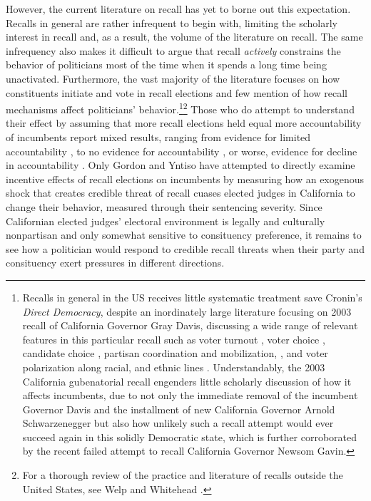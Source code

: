 \documentclass[hyphens, crop=false]{standalone}
\begin{document}
	However, the current literature on recall has yet to borne out this expectation.
	Recalls in general are rather infrequent to begin with,
	limiting the scholarly interest in recall and, as a result, the volume of the literature on recall.
	The same infrequency also makes it difficult to argue 
	that recall
	\textit
	{
		actively
	}
	constrains 
	the
	behavior of politicians 
	most of the time when it spends a long time being unactivated.
	Furthermore, the vast majority of the literature focuses on how 
	constituents initiate and vote in recall elections and 
	few mention of how recall mechanisms affect politicians' behavior.\footnote
	{
		Recalls in general in the US receives little systematic treatment save Cronin's
		\autocite{croninDirectDemocracyPolitics1989}
		\textit{Direct Democracy}, despite an inordinately large literature focusing on 2003 recall of California Governor Gray Davis, 
		discussing a wide range of relevant features in this particular recall such as 
		voter turnout
		\autocite{arbourVoterTurnoutCalifornia2005},
		voter choice 
		\autocite{alvarezRationalityRationalisticChoice2009,shawStrategicVotingCalifornia2005},
		candidate choice
		\autocite{mcgheeRoleCandidateChoice2009},
		partisan coordination and mobilization,
		\autocite{masketCaliforniaRecallSprint2016},
		and
		voter polarization along
		racial, and ethnic
		lines
		\autocite{seguraRaceRecallRacial2008}.
		Understandably, the 2003 California gubenatorial recall engenders little scholarly
		discussion of how it affects incumbents, 
		due to not only the immediate removal of the incumbent Governor Davis and 
		the
		installment of new California Governor Arnold Schwarzenegger
		but also 
		how unlikely such a recall attempt
		would ever succeed again in this solidly Democratic state,
		which is further corroborated by the recent failed attempt to recall California Governor Newsom Gavin.
	}\footnote
	{
		For a thorough review of the practice and literature of recalls outside the United States,
		see Welp and Whitehead \autocite*{welpPoliticsRecallElections2020}.
	}
	Those who do attempt to understand their effect
	by assuming that more recall elections held equal more accountability
	of incumbents report mixed results, 
	ranging from evidence for limited accountability
	\autocite{okamotoRecallJapanMeasure2020},
	to
	no evidence for accountability
	\autocite{welpRecallReferendumsPeruvian2016},
	or worse,
	evidence for decline in accountability
	\autocite{hamanRecallElectionsTool2021}.
	Only
	Gordon and Yntiso \autocite*{gordonIncentiveEffectsRecall2021a}
	have
	attempted to
	directly examine
	incentive effects of recall elections on incumbents
	by measuring how an exogenous shock that creates
	credible threat of recall cuases elected judges in California to 
	change their behavior,
	measured through
	their sentencing severity.
	Since Californian elected judges' electoral environment is legally and culturally nonpartisan and
	only somewhat sensitive to consituency preference,
	it remains to see how a politician would respond to credible recall threats when their party and consituency exert pressures in different directions.
	
\end{document}
